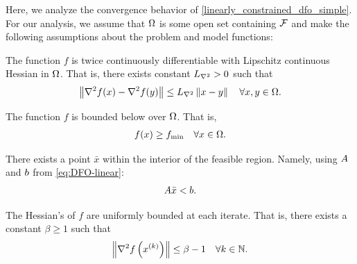 Here,  we analyze the convergence behavior of \cref{linearly_constrained_dfo_simple}.
For our analysis, we assume that $\Omega$ is some open set containing ${\mathcal F}$ and make the following assumptions about the problem and model functions:

\begin{assumption}
\label{for_fully_quadratic}
\label{lipschitz_hessian}
The function $f$ is twice continuously differentiable with Lipschitz continuous Hessian in $\Omega$.   That is, there exists constant ${L_{\nabla^2}} > 0$ such that 
\begin{align}
\left\|\nabla^2 f(x) - \nabla^2 f(y)\right\| \le {L_{\nabla^2}} \left\|x - y\right\| \quad \forall x, y \in \Omega.
\end{align}
\end{assumption}



\begin{assumption}
\label{lower_bound}
The function $f$ is bounded below over $\Omega$.
That is,
\begin{align}
f(x) \ge f_{\text{min}} \quad \forall x \in \Omega.
\end{align}
\end{assumption}

\begin{assumption}
\label{interior_point}
There exists a point $\bar x$ within the interior of the feasible region.
Namely, using ${A}$ and ${b}$ from \cref{eq:DFO-linear}:
\begin{align}
{A} \bar x < {b}.
\end{align}
\end{assumption}


\begin{assumption}
\label{uniformly_bounded_hessians_of_f}
The Hessian's of $f$ are uniformly bounded at each iterate. That is, there exists a constant $\beta \ge 1$ such that
\begin{align*}
\left\|\nabla^2 f\left(x^{(k)}\right)\right\| \le \beta - 1\quad \forall k \in \mathbb N.
\end{align*}
\end{assumption}


%



